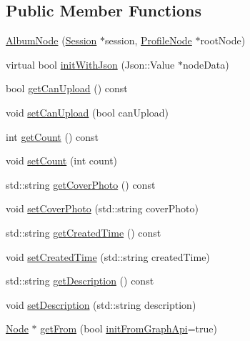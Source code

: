\subsection*{Public Member Functions}
\begin{DoxyCompactItemize}
\item 
\hyperlink{classfl4cpp_1_1_album_node_a20d49c25e6384a07a6a5eac4e7b72e4a}{Album\+Node} (\hyperlink{classfl4cpp_1_1_session}{Session} $\ast$session, \hyperlink{classfl4cpp_1_1_profile_node}{Profile\+Node} $\ast$root\+Node)
\item 
virtual bool \hyperlink{classfl4cpp_1_1_album_node_a175f018c63cf412b4e93e4a3b452791d}{init\+With\+Json} (Json\+::\+Value $\ast$node\+Data)
\item 
bool \hyperlink{classfl4cpp_1_1_album_node_accf89413bfb93f22f6510bff9ac4ac70}{get\+Can\+Upload} () const 
\item 
void \hyperlink{classfl4cpp_1_1_album_node_a4f9c0b9a4401f018def65b508b3baad9}{set\+Can\+Upload} (bool can\+Upload)
\item 
int \hyperlink{classfl4cpp_1_1_album_node_acba884a09f74feefc8a80099ae36366a}{get\+Count} () const 
\item 
void \hyperlink{classfl4cpp_1_1_album_node_a43b6221e9c8c40dc343ee514eab606fe}{set\+Count} (int count)
\item 
std\+::string \hyperlink{classfl4cpp_1_1_album_node_a26731488fd0c6de95093a021df659c1e}{get\+Cover\+Photo} () const 
\item 
void \hyperlink{classfl4cpp_1_1_album_node_a670e5384f58354ffa52989a4fe1c4cda}{set\+Cover\+Photo} (std\+::string cover\+Photo)
\item 
std\+::string \hyperlink{classfl4cpp_1_1_album_node_a0c29c7af809f8e0b60142ae3691aa729}{get\+Created\+Time} () const 
\item 
void \hyperlink{classfl4cpp_1_1_album_node_a6bd6ca8fd9da3738d713e213a99f1f8f}{set\+Created\+Time} (std\+::string created\+Time)
\item 
std\+::string \hyperlink{classfl4cpp_1_1_album_node_ae0d7d1dba84c73737aef9c7dc6a8ed03}{get\+Description} () const 
\item 
void \hyperlink{classfl4cpp_1_1_album_node_a68ac9858fd510e6e5251259a2875e539}{set\+Description} (std\+::string description)
\item 
\hyperlink{classfl4cpp_1_1_node}{Node} $\ast$ \hyperlink{classfl4cpp_1_1_album_node_aa0538270f1480c2fa88df26c98677ba5}{get\+From} (bool \hyperlink{classfl4cpp_1_1_node_a1dd4594ffd7eb08e9e8c5031d2109a59}{init\+From\+Graph\+Api}=true)

\end{DoxyCompactItemize}
